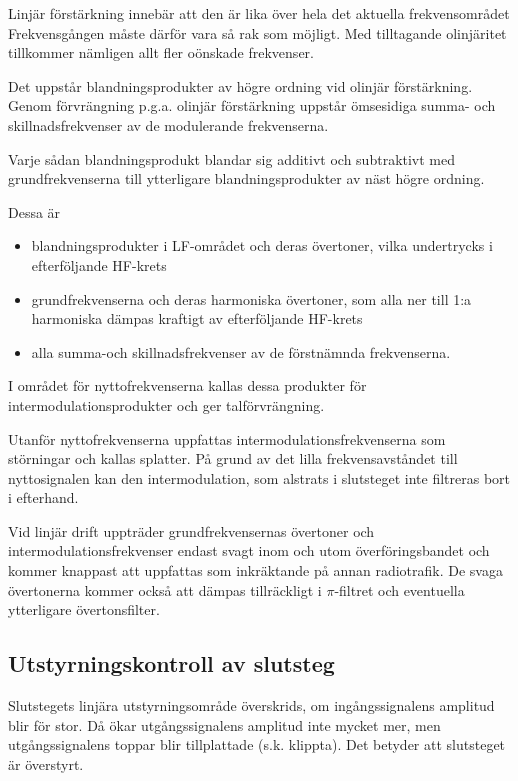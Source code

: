 Linjär förstärkning innebär att den är lika över hela det aktuella
frekvensområdet Frekvensgången måste därför vara så rak som
möjligt. Med tilltagande olinjäritet tillkommer nämligen allt fler
oönskade frekvenser.

Det uppstår blandningsprodukter av högre ordning vid olinjär
förstärkning. Genom förvrängning p.g.a. olinjär förstärkning uppstår
ömsesidiga summa- och skillnadsfrekvenser av de modulerande
frekvenserna.

Varje sådan blandningsprodukt blandar sig additivt och subtraktivt med
grundfrekvenserna till ytterligare blandningsprodukter av näst högre
ordning.

Dessa är
\begin{itemize}
\item blandningsprodukter i LF-området och deras övertoner, vilka
  undertrycks i efterföljande HF-krets

\item grundfrekvenserna och deras harmoniska övertoner, som alla ner
  till 1:a harmoniska dämpas kraftigt av efterföljande HF-krets

\item alla summa-och skillnadsfrekvenser av de förstnämnda frekvenserna.
\end{itemize}

I området för nyttofrekvenserna kallas dessa produkter för
intermodulationsprodukter och ger talförvrängning.

Utanför nyttofrekvenserna uppfattas intermodulationsfrekvenserna som
störningar och kallas splatter. På grund av det lilla
frekvensavståndet till nyttosignalen kan den intermodulation, som
alstrats i slutsteget inte filtreras bort i efterhand.

Vid linjär drift uppträder grundfrekvensernas övertoner och
intermodulationsfrekvenser endast svagt inom och utom
överföringsbandet och kommer knappast att uppfattas som inkräktande på
annan radiotrafik. De svaga övertonerna kommer också att dämpas
tillräckligt i \(\pi \)-filtret och eventuella ytterligare övertonsfilter.


\subsection{Utstyrningskontroll av slutsteg}

Slutstegets linjära utstyrningsområde överskrids, om ingångssignalens
amplitud blir för stor. Då ökar utgångssignalens amplitud inte mycket
mer, men utgångssignalens toppar blir tillplattade (s.k. klippta). Det
betyder att slutsteget är överstyrt.

